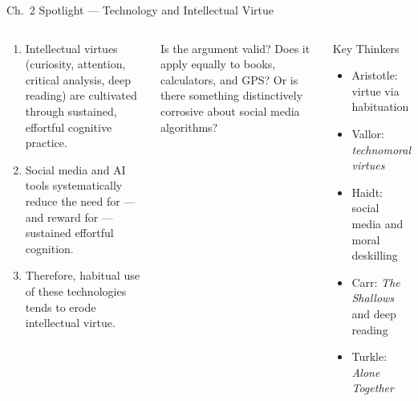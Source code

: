 \documentclass[aspectratio=169,10pt]{beamer}
\begin{document}
\begin{frame}{Ch.~2 Spotlight --- Technology and Intellectual Virtue}
\begin{columns}[c]
\begin{argumentbox}
\footnotesize
\begin{enumerate}
  \item Intellectual virtues (curiosity, attention, critical analysis, deep reading) are cultivated through sustained, effortful cognitive practice.
  \item Social media and AI tools systematically reduce the need for --- and reward for --- sustained effortful cognition.
  \item Therefore, habitual use of these technologies tends to erode intellectual virtue.
\end{enumerate}
\end{argumentbox}
\vspace{0.25em}
\begin{discussionbox}
\footnotesize Is the argument valid? Does it apply equally to books, calculators, and GPS? Or is there something distinctively corrosive about social media algorithms?
\end{discussionbox}
\begin{block}{Key Thinkers}
\footnotesize
\begin{itemize}
  \item Aristotle: virtue via habituation
  \item Vallor: \emph{technomoral virtues}
  \item Haidt: social media and moral deskilling
  \item Carr: \emph{The Shallows} and deep reading
  \item Turkle: \emph{Alone Together}
\end{itemize}
\end{block}
\end{columns}
\end{frame}
\end{document}
